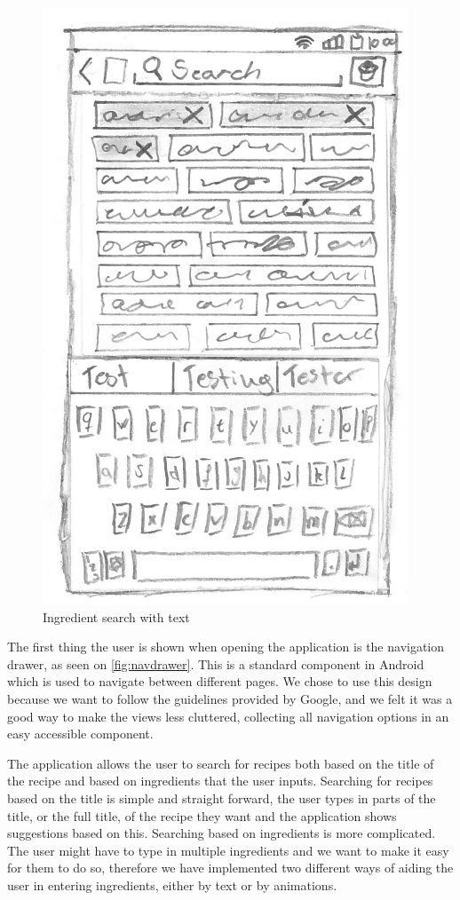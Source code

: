 \begin{figure}[H]
\begin{minipage}[b]{0.5\columnwidth}
\includegraphics[width=0.7\columnwidth]{img/prototypes/ingredient_search_text.pdf}
\caption{Ingredient search with text\label{fig:ingretext}}
\end{minipage}
\end{figure}

The first thing the user is shown when opening the application is the navigation drawer, as seen on \autoref{fig:navdrawer}. This is a standard component in Android which is used to navigate between different pages. We chose to use this design because we want to follow the guidelines provided by Google\cite{guidelines-appstructure}, and we felt it was a good way to make the views less cluttered, collecting all navigation options in an easy accessible component.

The application allows the user to search for recipes both based on the title of the recipe and based on ingredients that the user inputs. Searching for recipes based on the title is simple and straight forward, the user types in parts of the title, or the full title, of the recipe they want and the application shows suggestions based on this. Searching based on ingredients is more complicated. The user might have to type in multiple ingredients and we want to make it easy for them to do so, therefore we have implemented two different ways of aiding the user in entering ingredients, either by text or by animations.

